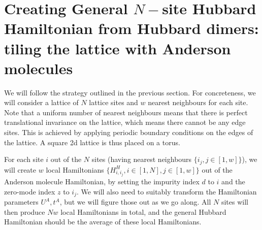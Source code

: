 \documentclass[12pt]{article}
\numberwithin{equation}{section}
\begin{document}
\section{Creating General \(N-\)site Hubbard Hamiltonian from Hubbard dimers: tiling the lattice with Anderson molecules}
We will follow the strategy outlined in the previous section. For concreteness, we will consider a lattice of \(N\) lattice sites and \(w\) nearest neighbours for each site. Note that a uniform number of nearest neighbours means that there is perfect translational invariance on the lattice, which means there cannot be any edge sites. This is achieved by applying periodic boundary conditions on the edges of the lattice. A square 2d lattice is thus placed on a torus.


For each site \(i\) out of the \(N\) sites (having nearest neighbours \(\{i_j, j\in\left[1,w\right]\}\)), we will create \(w\) local Hamiltonians \(\{H^H_{i,i_j}, i\in \left[1,N\right], j \in \left[1,w\right]  \}\) out of the Anderson molecule Hamiltonian, by setting the impurity index \(d\) to \(i\) and the zero-mode index \(z\) to \(i_j\). We will also need to suitably transform the Hamiltonian parameters \(U^A, t^A\), but we will figure those out as we go along. All \(N\) sites will then produce \(Nw\) local Hamiltonians in total, and the general Hubbard Hamiltonian should be the average of these local Hamiltonians. 
\end{document}
